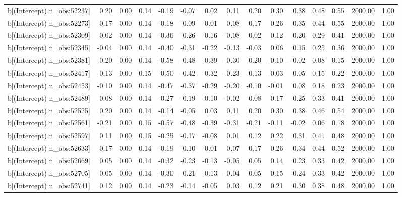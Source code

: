 \begin{table}[ht]
\begin{tabular}{rrrrrrrrrrrrrrr}
  b[(Intercept) n\_obs:52237] & 0.20 & 0.00 & 0.14 & -0.19 & -0.07 & 0.02 & 0.11 & 0.20 & 0.30 & 0.38 & 0.48 & 0.55 & 2000.00 & 1.00 \\ 
  b[(Intercept) n\_obs:52273] & 0.17 & 0.00 & 0.14 & -0.18 & -0.09 & -0.01 & 0.08 & 0.17 & 0.26 & 0.35 & 0.44 & 0.55 & 2000.00 & 1.00 \\ 
  b[(Intercept) n\_obs:52309] & 0.02 & 0.00 & 0.14 & -0.36 & -0.26 & -0.16 & -0.08 & 0.02 & 0.12 & 0.20 & 0.29 & 0.41 & 2000.00 & 1.00 \\ 
  b[(Intercept) n\_obs:52345] & -0.04 & 0.00 & 0.14 & -0.40 & -0.31 & -0.22 & -0.13 & -0.03 & 0.06 & 0.15 & 0.25 & 0.36 & 2000.00 & 1.00 \\ 
  b[(Intercept) n\_obs:52381] & -0.20 & 0.00 & 0.14 & -0.58 & -0.48 & -0.39 & -0.30 & -0.20 & -0.10 & -0.02 & 0.08 & 0.15 & 2000.00 & 1.00 \\ 
  b[(Intercept) n\_obs:52417] & -0.13 & 0.00 & 0.15 & -0.50 & -0.42 & -0.32 & -0.23 & -0.13 & -0.03 & 0.05 & 0.15 & 0.22 & 2000.00 & 1.00 \\ 
  b[(Intercept) n\_obs:52453] & -0.10 & 0.00 & 0.14 & -0.47 & -0.37 & -0.29 & -0.20 & -0.10 & -0.01 & 0.08 & 0.18 & 0.23 & 2000.00 & 1.00 \\ 
  b[(Intercept) n\_obs:52489] & 0.08 & 0.00 & 0.14 & -0.27 & -0.19 & -0.10 & -0.02 & 0.08 & 0.17 & 0.25 & 0.33 & 0.41 & 2000.00 & 1.00 \\ 
  b[(Intercept) n\_obs:52525] & 0.20 & 0.00 & 0.14 & -0.14 & -0.05 & 0.03 & 0.11 & 0.20 & 0.30 & 0.38 & 0.46 & 0.54 & 2000.00 & 1.00 \\ 
  b[(Intercept) n\_obs:52561] & -0.21 & 0.00 & 0.15 & -0.57 & -0.48 & -0.39 & -0.31 & -0.21 & -0.11 & -0.02 & 0.06 & 0.18 & 2000.00 & 1.00 \\ 
  b[(Intercept) n\_obs:52597] & 0.11 & 0.00 & 0.15 & -0.25 & -0.17 & -0.08 & 0.01 & 0.12 & 0.22 & 0.31 & 0.41 & 0.48 & 2000.00 & 1.00 \\ 
  b[(Intercept) n\_obs:52633] & 0.17 & 0.00 & 0.14 & -0.19 & -0.10 & -0.01 & 0.07 & 0.17 & 0.26 & 0.34 & 0.44 & 0.52 & 2000.00 & 1.00 \\ 
  b[(Intercept) n\_obs:52669] & 0.05 & 0.00 & 0.14 & -0.32 & -0.23 & -0.13 & -0.05 & 0.05 & 0.14 & 0.23 & 0.33 & 0.42 & 2000.00 & 1.00 \\ 
  b[(Intercept) n\_obs:52705] & 0.05 & 0.00 & 0.14 & -0.30 & -0.21 & -0.13 & -0.04 & 0.05 & 0.15 & 0.24 & 0.33 & 0.42 & 2000.00 & 1.00 \\ 
  b[(Intercept) n\_obs:52741] & 0.12 & 0.00 & 0.14 & -0.23 & -0.14 & -0.05 & 0.03 & 0.12 & 0.21 & 0.30 & 0.38 & 0.48 & 2000.00 & 1.00 \\ 

\end{tabular}
\end{table}
